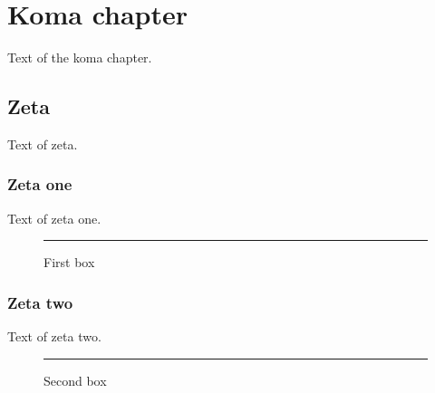 \documentclass{scrreprt}
\begin{document}
\tableofcontents
\listoffigures
\chapter{Koma chapter}
Text of the koma chapter.
\section{Zeta}
Text of zeta.
\subsection{Zeta one}
Text of zeta one.
\begin{figure}[h]
\centering\rule{2em}{1em}
\caption{First box}
\end{figure}
\subsection{Zeta two}
Text of zeta two.
\begin{figure}[h]
\centering\rule{2em}{1em}
\caption{Second box}
\end{figure}
\end{document}
